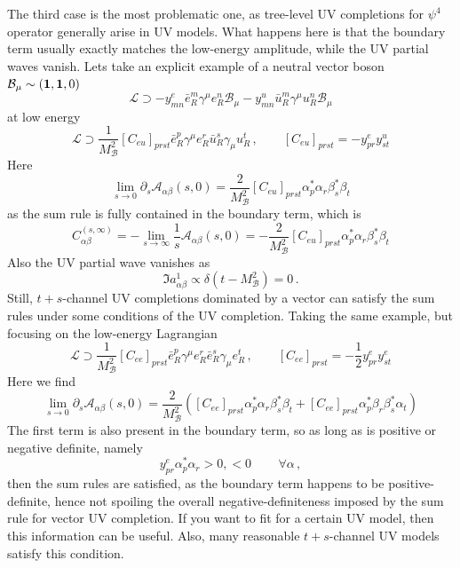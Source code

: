 \documentclass[a4paper,11pt]{article}
\begin{document}
The third case is the most problematic one, as tree-level UV completions for $\psi^4$ operator generally arise in UV models. What happens here is that the boundary term usually exactly matches the low-energy amplitude, while the UV partial waves vanish. Lets take an explicit example of a neutral vector boson $\mathcal{B}_\mu\sim(\bold1,\bold1,0)$ 
\begin{equation}
    \mathcal{L}\supset -y^e_{mn}\bar e_R^m \gamma^\mu e_R^n \mathcal{B}_\mu-y^u_{mn}\bar u_R^m \gamma^\mu u_R^n \mathcal{B}_\mu
\end{equation}
at low energy
\begin{equation}
    \mathcal{L}\supset \dfrac{1}{M_\mathcal{B}^2}[C_{eu}]_{prst}\bar e_R^p\gamma^\mu e_R^r\bar u_R^s\gamma_\mu u_R^t\,,\qquad [C_{eu}]_{prst}= -y^e_{pr} y^u_{st}
\end{equation}
Here 
\begin{equation}
    \lim_{s\to 0}\partial_s\mathcal{A}_{\alpha\beta}(s,0)= \dfrac{2}{M_\mathcal{B}^2}[C_{eu}]_{prst}\alpha^*_p\alpha_r\beta^*_s\beta_t 
\end{equation}
as the sum rule is fully contained in the boundary term, which is 
\begin{equation}
    C^{(s,\infty)}_{\alpha\beta}=-\lim_{s\to \infty}\dfrac{1}{s}\mathcal{A}_{\alpha\beta}(s,0)=-\dfrac{2}{M_\mathcal{B}^2}[C_{eu}]_{prst}\alpha^*_p\alpha_r\beta^*_s\beta_t
\end{equation}
Also the UV partial wave vanishes as
\begin{equation}
    \Im a_{\alpha\beta}^1\propto \delta(t-M_\mathcal{B}^2)=0\,.
\end{equation}
Still, $t+s$-channel UV completions dominated by a vector can satisfy the sum rules under some conditions of the UV completion. Taking the same example, but focusing on the low-energy Lagrangian
\begin{equation}
    \mathcal{L}\supset \dfrac{1}{M_{\mathcal{B}}^2}[C_{ee}]_{prst}\bar e_R^p\gamma^\mu e_R^r\bar e_R^s\gamma_\mu e_R^t\,,\qquad [C_{ee}]_{prst}= -\dfrac{1}{2}y^e_{pr} y^e_{st}
\end{equation}
Here we find
\begin{equation}
    \lim_{s\to 0}\partial_s\mathcal{A}_{\alpha\beta}(s,0)= \dfrac{2}{M_\mathcal{B}^2}\left([C_{ee}]_{prst}\alpha^*_p\alpha_r\beta^*_s\beta_t+[C_{ee}]_{prst}\alpha^*_p\beta_r\beta^*_s\alpha_t \right)
\end{equation}
The first term is also present in the boundary term, so as long as is positive or negative definite, namely
\begin{equation}
    y^e_{pr}\alpha^*_p\alpha_r>0, <0\,\qquad \forall\alpha\,,
\end{equation}
then the sum rules are satisfied, as the boundary term happens to be positive-definite, hence not spoiling the overall negative-definiteness imposed by the sum rule for vector UV completion. If you want to fit for a certain UV model, then this information can be useful. Also, many reasonable $t+s$-channel UV models satisfy this condition.
\end{document}
